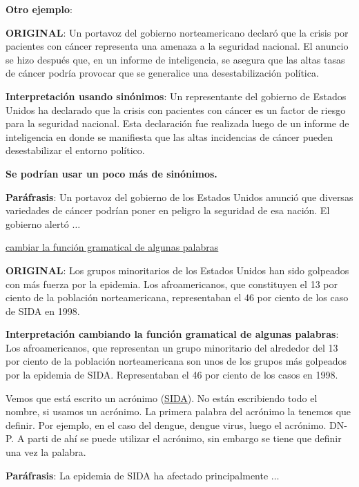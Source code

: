 \documentclass{article}
\begin{document}
\textbf{Otro ejemplo}:

\textbf{ORIGINAL}: Un portavoz del gobierno norteamericano declaró que la crisis por pacientes con cáncer representa una amenaza a la seguridad nacional. El anuncio se hizo después que, en un informe de inteligencia, se asegura que las altas tasas de cáncer podría provocar que se generalice una desestabilización política.

\textbf{Interpretación usando sinónimos}: Un representante del gobierno de Estados Unidos ha declarado que la crisis con pacientes con cáncer es un factor de riesgo para la seguridad nacional. Esta declaración fue realizada luego de un informe de inteligencia en donde se manifiesta que las altas incidencias de cáncer pueden desestabilizar el entorno político. 


\textbf{Se podrían usar un poco más de sinónimos.} \vspace{0.5cm}

\textbf{Paráfrasis}: Un portavoz del gobierno de los Estados Unidos anunció que diversas variedades de cáncer podrían poner en peligro la seguridad de esa nación. El gobierno alertó $\ldots$ \vspace{0.5cm}

\underline{cambiar la función gramatical de algunas palabras} \vspace{0.5cm}

\textbf{ORIGINAL}: Los grupos minoritarios de los Estados Unidos han sido golpeados con más fuerza por la epidemia. Los afroamericanos, que constituyen el 13 por ciento de la población norteamericana, representaban el 46 por ciento de los caso de SIDA en 1998.     


\textbf{Interpretación cambiando la función gramatical de algunas palabras}: Los afroamericanos, que representan un grupo minoritario del alrededor del 13 por ciento de la población norteamericana son unos de los grupos más golpeados por la epidemia de SIDA. Representaban el 46 por ciento de los casos en 1998. 

Vemos que está escrito un acrónimo (\underline{SIDA}). No están escribiendo todo el nombre, si usamos un acrónimo. La primera palabra del acrónimo la tenemos que definir. Por ejemplo, en el caso del dengue, dengue virus, luego el acrónimo. DN-P. A parti de ahí se puede utilizar el acrónimo, sin embargo se tiene que definir una vez la palabra. \vspace{0.5cm}


\textbf{Paráfrasis}: La epidemia de SIDA ha afectado principalmente $\ldots$ \vspace{0.5cm}
 
\end{document}
